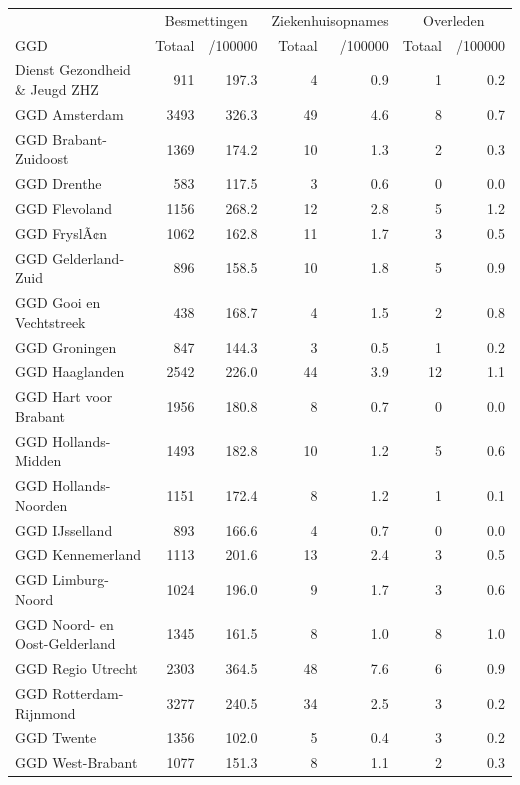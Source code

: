 \documentclass[
  english,
  man,floatsintext]{apa6}
\begin{document}
\begin{table}
\centering\begingroup\fontsize{10}{12}\selectfont

\begin{threeparttable}
\begin{tabular}{lrrrrrr}
\toprule
\multicolumn{1}{c}{ } & \multicolumn{2}{c}{Besmettingen} & \multicolumn{2}{c}{Ziekenhuisopnames} & \multicolumn{2}{c}{Overleden} \\
\cmidrule(l{3pt}r{3pt}){2-3} \cmidrule(l{3pt}r{3pt}){4-5} \cmidrule(l{3pt}r{3pt}){6-7}
GGD & Totaal & /100000 & Totaal & /100000 & Totaal & /100000\\
\midrule
Dienst Gezondheid \& Jeugd ZHZ & 911 & 197.3 & 4 & 0.9 & 1 & 0.2\\
GGD Amsterdam & 3493 & 326.3 & 49 & 4.6 & 8 & 0.7\\
GGD Brabant-Zuidoost & 1369 & 174.2 & 10 & 1.3 & 2 & 0.3\\
GGD Drenthe & 583 & 117.5 & 3 & 0.6 & 0 & 0.0\\
GGD Flevoland & 1156 & 268.2 & 12 & 2.8 & 5 & 1.2\\
GGD FryslÃ¢n & 1062 & 162.8 & 11 & 1.7 & 3 & 0.5\\
GGD Gelderland-Zuid & 896 & 158.5 & 10 & 1.8 & 5 & 0.9\\
GGD Gooi en Vechtstreek & 438 & 168.7 & 4 & 1.5 & 2 & 0.8\\
GGD Groningen & 847 & 144.3 & 3 & 0.5 & 1 & 0.2\\
GGD Haaglanden & 2542 & 226.0 & 44 & 3.9 & 12 & 1.1\\
GGD Hart voor Brabant & 1956 & 180.8 & 8 & 0.7 & 0 & 0.0\\
GGD Hollands-Midden & 1493 & 182.8 & 10 & 1.2 & 5 & 0.6\\
GGD Hollands-Noorden & 1151 & 172.4 & 8 & 1.2 & 1 & 0.1\\
GGD IJsselland & 893 & 166.6 & 4 & 0.7 & 0 & 0.0\\
GGD Kennemerland & 1113 & 201.6 & 13 & 2.4 & 3 & 0.5\\
GGD Limburg-Noord & 1024 & 196.0 & 9 & 1.7 & 3 & 0.6\\
GGD Noord- en Oost-Gelderland & 1345 & 161.5 & 8 & 1.0 & 8 & 1.0\\
GGD Regio Utrecht & 2303 & 364.5 & 48 & 7.6 & 6 & 0.9\\
GGD Rotterdam-Rijnmond & 3277 & 240.5 & 34 & 2.5 & 3 & 0.2\\
GGD Twente & 1356 & 102.0 & 5 & 0.4 & 3 & 0.2\\
GGD West-Brabant & 1077 & 151.3 & 8 & 1.1 & 2 & 0.3\\

\end{tabular}
\end{threeparttable}
\end{table}
\end{document}
